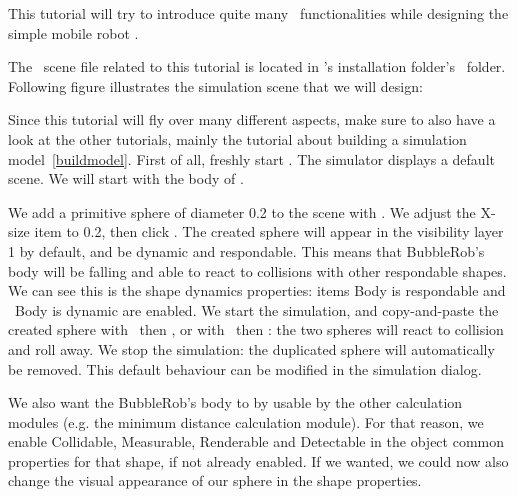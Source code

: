 \label{bublerob}


This tutorial will try to introduce quite many \vrep\ functionalities while 
designing the simple mobile robot . 

The \vrep\ scene file 
related to this tutorial is located in \vrep's installation folder's 
\ folder. Following figure illustrates the 
simulation scene that we will design:


Since this tutorial will fly over many different aspects, make sure to also 
have a look at the other tutorials, mainly the tutorial about building a 
simulation model\ \ref{buildmodel}. First of all, freshly start \vrep. 
The simulator displays 
a default scene. We will start with the body of .

We add a primitive sphere of diameter 0.2 to the scene with
. We adjust the X-size item to 0.2, 
then click . The created sphere will appear in the visibility layer 
1 by default, and be dynamic and respondable. This means that 
BubbleRob's body will be falling and able to react to collisions with other 
respondable shapes. We can see 
this is the shape dynamics properties: items Body is respondable and 
\checkbox\ Body is dynamic are enabled. We start the simulation, and 
copy-and-paste the created sphere with
\ then , or 
with \ then : the two spheres will react to 
collision and roll away. We stop the simulation: the duplicated sphere will 
automatically be removed. This default behaviour can be modified in the 
simulation dialog.

We also want the BubbleRob's body to by usable by the other calculation 
modules (e.g. the minimum distance calculation module). For that reason, we
enable Collidable, Measurable, Renderable and Detectable in the object 
common properties for that shape, if not already enabled. If we wanted, we 
could now also change the visual appearance of our sphere in the shape 
properties.

